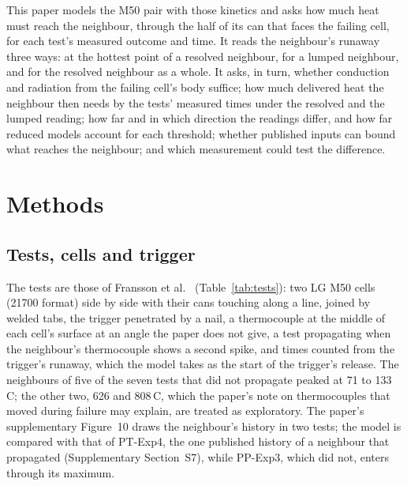 \documentclass[preprint,12pt]{elsarticle}
\newcommand{\degC}{\,\textdegree C}
\begin{document}
This paper models the M50 pair with those kinetics and asks how much heat must reach the neighbour, through the half of its can that faces the failing cell, for each test's measured outcome and time. It reads the neighbour's runaway three ways: at the hottest point of a resolved neighbour, for a lumped neighbour, and for the resolved neighbour as a whole. It asks, in turn, whether conduction and radiation from the failing cell's body suffice; how much delivered heat the neighbour then needs by the tests' measured times under the resolved and the lumped reading; how far and in which direction the readings differ, and how far reduced models account for each threshold; whether published inputs can bound what reaches the neighbour; and which measurement could test the difference.

\section{Methods}
\label{sec:methods}

\subsection{Tests, cells and trigger}
\label{sec:tests}

The tests are those of Fransson et al.~\cite{fransson2024exploring} (Table~\ref{tab:tests}): two LG M50 cells (21700 format) side by side with their cans touching along a line, joined by welded tabs, the trigger penetrated by a nail, a thermocouple at the middle of each cell's surface at an angle the paper does not give, a test propagating when the neighbour's thermocouple shows a second spike, and times counted from the trigger's runaway, which the model takes as the start of the trigger's release. The neighbours of five of the seven tests that did not propagate peaked at 71 to 133\degC; the other two, 626 and 808\degC, which the paper's note on thermocouples that moved during failure may explain, are treated as exploratory. The paper's supplementary Figure~10 draws the neighbour's history in two tests; the model is compared with that of PT-Exp4, the one published history of a neighbour that propagated (Supplementary Section~S7), while PP-Exp3, which did not, enters through its maximum.
\end{document}
